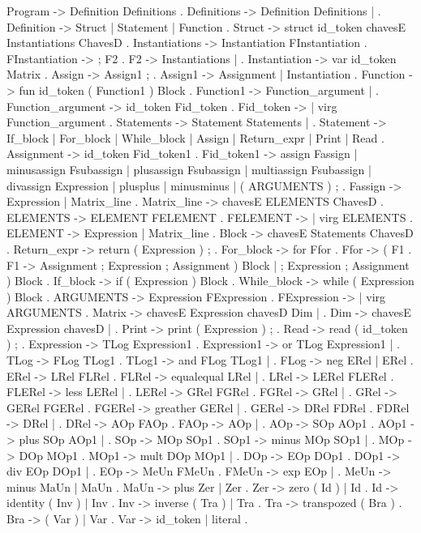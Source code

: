 Program ->   Definition Definitions .
Definitions -> Definition Definitions | .
Definition ->    Struct |   Statement |   Function .
Struct ->    struct id_token chavesE Instantiations ChavesD .
Instantiations -> Instantiation FInstantiation .
FInstantiation -> ; F2 .
F2 -> Instantiations |  .
Instantiation -> var id_token Matrix .
Assign ->    Assign1 ; .
Assign1 ->   Assignment |   Instantiation .
Function ->  fun id_token ( Function1 ) Block .
Function1 -> Function_argument |    .
Function_argument -> id_token Fid_token .
Fid_token ->  |   virg Function_argument .
Statements -> Statement Statements |  .
Statement -> If_block | For_block |   While_block |   Assign |   Return_expr |   Print |   Read .
Assignment ->    id_token Fid_token1 .
Fid_token1 ->    assign Fassign |   minusassign Fsubassign |   plusassign Fsubassign |   multiassign Fsubassign |   divassign Expression |   plusplus |   minusminus | ( ARGUMENTS ) ; .
Fassign ->   Expression |   Matrix_line .
Matrix_line ->   chavesE ELEMENTS ChavesD .
ELEMENTS ->  ELEMENT FELEMENT .
FELEMENT ->   |   virg ELEMENTS .
ELEMENT ->   Expression |   Matrix_line .
Block -> chavesE Statements ChavesD .
Return_expr ->   return ( Expression ) ; .
For_block -> for Ffor .
Ffor ->  ( F1 .
F1 ->    Assignment ; Expression ; Assignment ) Block |    ; Expression ; Assignment ) Block .
If_block ->  if ( Expression ) Block .
While_block ->   while ( Expression ) Block .
ARGUMENTS -> Expression FExpression .
FExpression ->  |   virg ARGUMENTS .
Matrix ->    chavesE Expression chavesD Dim | .
Dim ->   chavesE Expression chavesD |    .
Print -> print ( Expression ) ; .
Read ->  read ( id_token ) ; .
Expression ->    TLog Expression1 .
Expression1 ->   or TLog Expression1 |     .
TLog ->  FLog TLog1 .
TLog1 -> and FLog TLog1 |     .
FLog ->  neg ERel |   ERel .
ERel ->  LRel FLRel .
FLRel -> equalequal LRel |     .
LRel ->  LERel FLERel .
FLERel ->    less LERel |     .
LERel -> GRel FGRel .
FGRel -> \leq GRel |     .
GRel ->  GERel FGERel .
FGERel ->    greather GERel |     .
GERel -> DRel FDRel .
FDRel -> \geq DRel |     .
DRel ->  AOp FAOp .
FAOp ->  \neq AOp |     .
AOp ->   SOp AOp1 .
AOp1 ->  plus SOp AOp1 |     .
SOp ->   MOp SOp1 .
SOp1 ->  minus MOp SOp1 |     .
MOp ->   DOp MOp1 .
MOp1 ->  mult DOp MOp1 |     .
DOp ->   EOp DOp1 .
DOp1 ->  div EOp DOp1 |     .
EOp ->   MeUn FMeUn .
FMeUn -> exp EOp |     .
MeUn ->  minus MaUn |   MaUn .
MaUn ->  plus Zer |   Zer .
Zer ->   zero ( Id ) |   Id .
Id ->    identity ( Inv ) |   Inv .
Inv ->   inverse ( Tra ) |   Tra .
Tra ->   transpozed ( Bra ) .
Bra ->   ( Var ) | Var .
Var ->   id_token | literal .